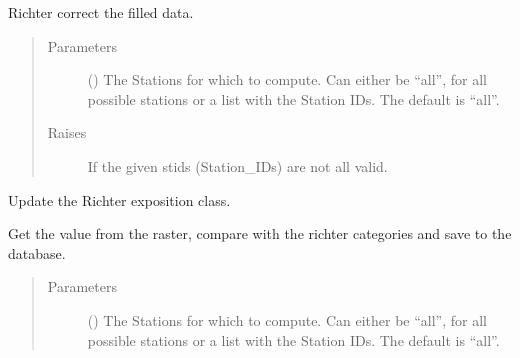 \documentclass[letterpaper,10pt,english]{sphinxmanual}
\begin{document}
\begin{fulllineitems}
\begin{fulllineitems}
\label{\detokenize{weatherDB:weatherDB.stations.PrecipitationStations.richter_correct}}
\sphinxAtStartPar
Richter correct the filled data.
\begin{quote}\begin{description}
\item[{Parameters}] \leavevmode
\sphinxAtStartPar
{} (\sphinxstyleliteralemphasis{\sphinxupquote{, }}) \textendash{} The Stations for which to compute.
Can either be “all”, for all possible stations
or a list with the Station IDs.
The default is “all”.

\item[{Raises}] \leavevmode
\sphinxAtStartPar
{} \textendash{} If the given stids (Station\_IDs) are not all valid.

\end{description}\end{quote}

\end{fulllineitems}


\begin{fulllineitems}
\label{\detokenize{weatherDB:weatherDB.stations.PrecipitationStations.update_richter_class}}
\sphinxAtStartPar
Update the Richter exposition class.

\sphinxAtStartPar
Get the value from the raster, compare with the richter categories and save to the database.
\begin{quote}\begin{description}
\item[{Parameters}] \leavevmode
\sphinxAtStartPar
{} (\sphinxstyleliteralemphasis{\sphinxupquote{, }}) \textendash{} The Stations for which to compute.
Can either be “all”, for all possible stations
or a list with the Station IDs.
The default is “all”.


\end{description}
\end{quote}
\end{fulllineitems}
\end{fulllineitems}
\end{document}
